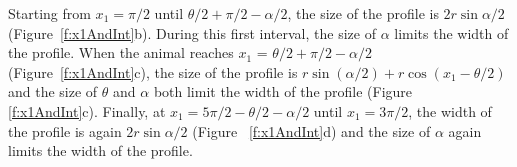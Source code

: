 Starting from $x_1 = \pi/2$ until $\theta/2 + \pi/2 - \alpha/2$, the size of the profile is $2r\sin \alpha/2$ (Figure~\ref{f:x1AndInt}b).
During this first interval, the size of $\alpha$ limits the width of the profile.
When the animal reaches $x_1$  = $\theta/2 + \pi/2 - \alpha/2$ (Figure~\ref{f:x1AndInt}c), the size of the profile is $r\sin( \alpha/2) + r\cos( x_1  - \theta/2)$ and the size of $\theta$ and $\alpha$ both limit the width of the profile (Figure~ \ref{f:x1AndInt}c).
Finally, at $x_1  = 5\pi/2 - \theta/2  - \alpha/2$ until $x_1  = 3\pi/2$, the width of the profile is again $2r\sin\alpha/2$ (Figure~ \ref{f:x1AndInt}d) and the size of $\alpha$ again limits the width of the profile. 


\begin{figure}[t]
	\centering
  


\end{figure}
